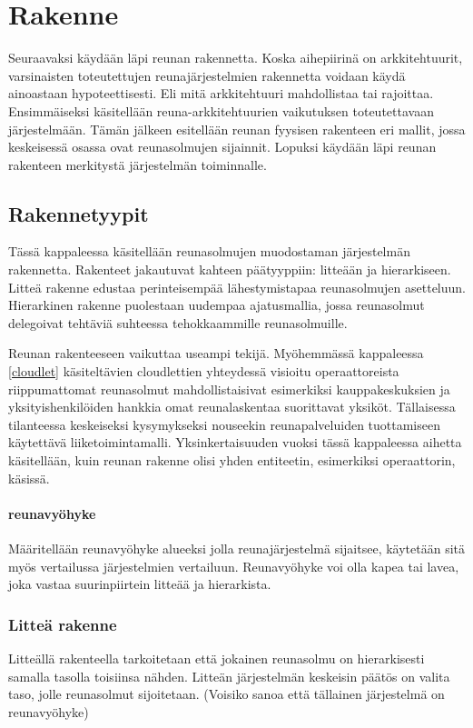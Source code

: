\section{Rakenne} \label{rakenne}
Seuraavaksi käydään läpi reunan rakennetta. Koska aihepiirinä on arkkitehtuurit, varsinaisten toteutettujen reunajärjestelmien rakennetta voidaan käydä ainoastaan hypoteettisesti. 
Eli mitä arkkitehtuuri mahdollistaa tai rajoittaa.
Ensimmäiseksi käsitellään reuna-arkkitehtuurien vaikutuksen toteutettavaan järjestelmään.
Tämän jälkeen esitellään reunan fyysisen rakenteen eri mallit, jossa keskeisessä osassa ovat reunasolmujen sijainnit.
Lopuksi käydään läpi reunan rakenteen merkitystä järjestelmän toiminnalle.



\subsection{Rakennetyypit}
Tässä kappaleessa käsitellään reunasolmujen muodostaman järjestelmän rakennetta. Rakenteet jakautuvat kahteen päätyyppiin: litteään ja hierarkiseen.
Litteä rakenne edustaa perinteisempää lähestymistapaa reunasolmujen asetteluun. Hierarkinen rakenne puolestaan uudempaa ajatusmallia, jossa reunasolmut delegoivat tehtäviä suhteessa tehokkaammille reunasolmuille. 

Reunan rakenteeseen vaikuttaa useampi tekijä. Myöhemmässä kappaleessa \ref{cloudlet} käsiteltävien cloudlettien yhteydessä visioitu operaattoreista riippumattomat reunasolmut mahdollistaisivat esimerkiksi kauppakeskuksien ja yksityishenkilöiden hankkia omat reunalaskentaa suorittavat yksiköt. Tällaisessa tilanteessa keskeiseksi kysymykseksi nouseekin reunapalveluiden tuottamiseen käytettävä liiketoimintamalli. Yksinkertaisuuden vuoksi tässä kappaleessa aihetta käsitellään, kuin reunan rakenne olisi yhden entiteetin, esimerkiksi operaattorin, käsissä. 

\paragraph*{reunavyöhyke}
Määritellään reunavyöhyke alueeksi jolla reunajärjestelmä sijaitsee, käytetään sitä myös vertailussa järjestelmien vertailuun. Reunavyöhyke voi olla kapea tai lavea, joka vastaa suurinpiirtein litteää ja hierarkista.

\subsubsection{Litteä rakenne}
Litteällä rakenteella tarkoitetaan että jokainen reunasolmu on hierarkisesti samalla tasolla toisiinsa nähden. Litteän järjestelmän keskeisin päätös on valita taso, jolle reunasolmut sijoitetaan. (Voisiko sanoa että tällainen järjestelmä on reunavyöhyke)

